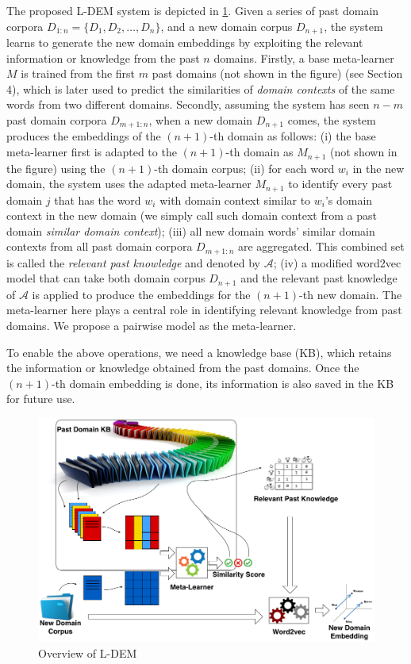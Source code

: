 The proposed L-DEM system is depicted in \ref{chap3:fig:fr}.
Given a series of past domain corpora $D_{1:n}=\{D_1, D_2, \dots, D_n\}$, and a new domain corpus $D_{n+1}$, the system learns to generate the new domain embeddings by exploiting the relevant information or knowledge from the past $n$ domains.
Firstly, a base meta-learner $M$ is trained from the first $m$ past domains (not shown in the figure) (see Section 4), which is later used to predict the similarities of \emph{domain contexts} of the same words from two different domains.
Secondly, assuming the system has seen $n-m$ past domain corpora $D_{m+1:n}$, when a new domain $D_{n+1}$ comes, the system produces the embeddings of the $(n+1)$-th domain as follows:
(i) the base meta-learner first is adapted to the $(n+1)$-th domain as $M_{n+1}$ (not shown in the figure) using the $(n+1)$-th domain corpus;
(ii) for each word $w_{i}$ in the new domain, the system uses the adapted meta-learner $M_{n+1}$ to identify every past domain $j$ that has the word $w_{i}$ with domain context similar to $w_{i}$'s domain context in the new domain (we simply call such domain context from a past domain \emph{similar domain context});
(iii) all new domain words' similar domain contexts from all past domain corpora $D_{m+1:n}$ are aggregated. This combined set is called the \textit{relevant past knowledge} and denoted by $\mathcal{A}$;
(iv) a modified word2vec model that can take both domain corpus $D_{n+1}$ and the relevant past knowledge of $\mathcal{A}$ is applied to produce the embeddings for the $(n+1)$-th new domain.
The meta-learner here plays a central role in identifying relevant knowledge from past domains.
We propose a pairwise model as the meta-learner. 

To enable the above operations, we need a knowledge base (KB), which retains the information or knowledge obtained from the past domains. Once the $(n+1)$-th domain embedding is done, its information is also saved in the KB for future use.
\begin{figure}[t]
    \label{fig:ll}
    \centering    
    \includegraphics[width=5.0in]{fig/ijcai18_ll.png}
        \caption{Overview of L-DEM}
        \label{chap3:fig:fr}
    \end{figure}

